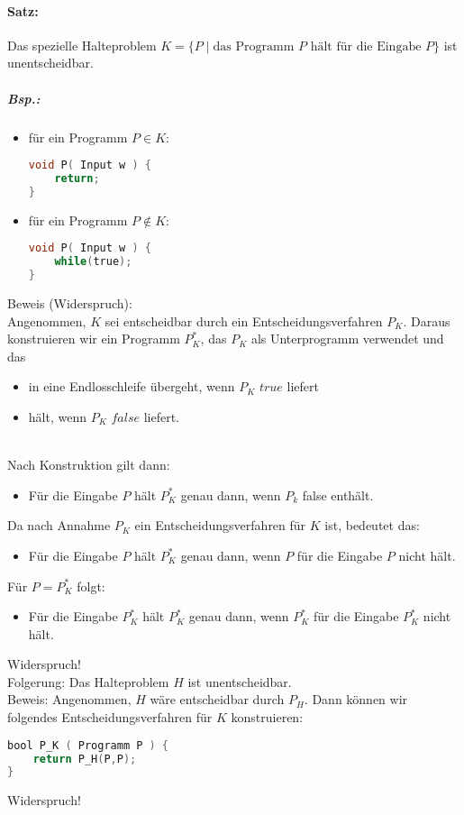 \paragraph{Satz:} Das spezielle Halteproblem $K=\{P\;|\;\text{das Programm $P$ hält für die Eingabe }P\}$ ist unentscheidbar.
\subparagraph{Bsp.:}
\begin{itemize}
\item für ein Programm $P \in K$:\begin{lstlisting}[language=C]
void P( Input w ) {
	return;
}
\end{lstlisting}
\item für ein Programm $P \not \in K$:
\begin{lstlisting}[language=C]
void P( Input w ) {
	while(true);
}
\end{lstlisting}
\end{itemize}
Beweis (Widerspruch):\\
Angenommen, $K$ sei entscheidbar durch ein Entscheidungsverfahren $P_K$. Daraus konstruieren wir ein Programm $P_K^*$, das $P_K$ als Unterprogramm verwendet und das
\begin{itemize}
\item in eine Endlosschleife übergeht, wenn $P_K$ $true$ liefert
\item hält, wenn $P_K$ $false$ liefert.
\end{itemize}
\\
Nach Konstruktion gilt dann:
\begin{itemize}
\item Für die Eingabe $P$ hält $P_K^*$ genau dann, wenn $P_k$ false enthält.
\end{itemize}
Da nach Annahme $P_K$ ein Entscheidungsverfahren für $K$ ist, bedeutet das:
\begin{itemize}
\item Für die Eingabe $P$ hält $P_K^*$ genau dann, wenn $P$ für die Eingabe $P$ nicht hält.
\end{itemize}
Für $P=P_K^*$ folgt:
\begin{itemize}
\item Für die Eingabe $P_K^*$ hält $P_K^*$ genau dann, wenn $P_K^*$ für die Eingabe $P_K^*$ nicht hält.
\end{itemize}
Widerspruch!\medskip\\
Folgerung: Das Halteproblem $H$ ist unentscheidbar.\\
Beweis: Angenommen, $H$ wäre entscheidbar durch $P_H$. Dann können wir folgendes Entscheidungsverfahren für $K$ konstruieren:
\begin{lstlisting}[language=C]
bool P_K ( Programm P ) {
	return P_H(P,P);
}
\end{lstlisting}
Widerspruch!

